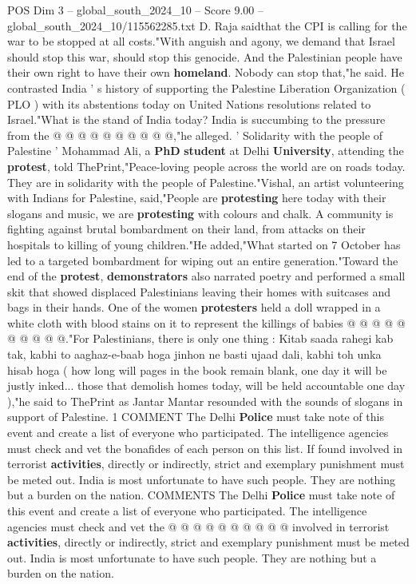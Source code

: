 \begin{textsample}{POS Dim 3 – global\_south\_2024\_10 – Score 9.00 – global\_south\_2024\_10/115562285.txt}
D.
Raja saidthat the CPI is calling for the war to be stopped at all costs."With anguish and agony, we demand that Israel should stop this war, should stop this genocide.
And the Palestinian people have their own right to have their own \textbf{homeland}.
Nobody can stop that,"he said.
He contrasted India ' s history of supporting the Palestine Liberation Organization ( PLO ) with its abstentions today on United Nations resolutions related to Israel."What is the stand of India today?
India is succumbing to the pressure from the @ @ @ @ @ @ @ @ @ @,"he alleged. ' Solidarity with the people of Palestine ' Mohammad Ali, a \textbf{PhD} \textbf{student} at Delhi \textbf{University}, attending the \textbf{protest}, told ThePrint,"Peace-loving people across the world are on roads today.
They are in solidarity with the people of Palestine."Vishal, an artist volunteering with Indians for Palestine, said,"People are \textbf{protesting} here today with their slogans and music, we are \textbf{protesting} with colours and chalk.
A community is fighting against brutal bombardment on their land, from attacks on their hospitals to killing of young children."He added,"What started on 7 October has led to a targeted bombardment for wiping out an entire generation."Toward the end of the \textbf{protest}, \textbf{demonstrators} also narrated poetry and performed a small skit that showed displaced Palestinians leaving their homes with suitcases and bags in their hands.
One of the women \textbf{protesters} held a doll wrapped in a white cloth with blood stains on it to represent the killings of babies @ @ @ @ @ @ @ @ @ @."For Palestinians, there is only one thing : Kitab saada rahegi kab tak, kabhi to aaghaz-e-baab hoga jinhon ne basti ujaad dali, kabhi toh unka hisab hoga ( how long will pages in the book remain blank, one day it will be justly inked... those that demolish homes today, will be held accountable one day ),"he said to ThePrint as Jantar Mantar resounded with the sounds of slogans in support of Palestine. 1 COMMENT The Delhi \textbf{Police} must take note of this event and create a list of everyone who participated.
The intelligence agencies must check and vet the bonafides of each person on this list.
If found involved in terrorist \textbf{activities}, directly or indirectly, strict and exemplary punishment must be meted out.
India is most unfortunate to have such people.
They are nothing but a burden on the nation.
COMMENTS The Delhi \textbf{Police} must take note of this event and create a list of everyone who participated.
The intelligence agencies must check and vet the @ @ @ @ @ @ @ @ @ @ involved in terrorist \textbf{activities}, directly or indirectly, strict and exemplary punishment must be meted out.
India is most unfortunate to have such people.
They are nothing but a burden on the nation.

\end{textsample}
